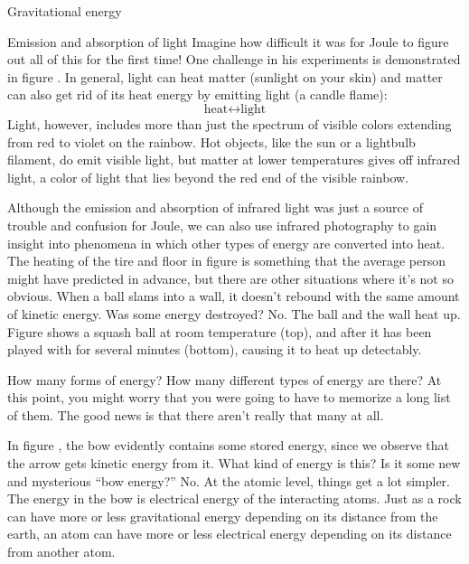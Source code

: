 \begin{envsubsection}{Gravitational energy}
\begin{envsubsection}{Emission and absorption of light}
Imagine how difficult it was for Joule to figure out all of this for the first time! One
challenge in his experiments is demonstrated in figure
. In general, light can heat matter
(sunlight on your skin) and matter can also get rid of its heat energy by emitting light
(a candle flame):
\begin{equation*}
	\text{heat} \leftrightarrow \text{light}
\end{equation*}
Light, however, includes more than just the spectrum of visible colors extending from
red to violet on the rainbow. Hot objects, like the sun or a lightbulb filament, do emit
visible light, but matter at lower temperatures gives off
infrared light, a color of light that lies beyond the red end of the visible rainbow. 

Although the emission and
absorption of infrared light was just a source of trouble and confusion for Joule, we can
also use infrared photography to gain insight into phenomena in which other types of energy
are converted into heat.
The heating of the tire and floor in figure  is something that
the average person might have predicted in advance, but there are other situations
where it's not so obvious. When a ball slams into a wall, it doesn't rebound with the
same amount of kinetic energy. Was some energy destroyed? No.
The ball and the wall heat up. Figure  shows
a squash ball at room temperature (top), and after it has been played with for
several minutes (bottom), causing it to heat up detectably.
\end{envsubsection}
%
\begin{envsubsection}{How many forms of energy?}
How many different types of energy are there? At this point, you might worry that
you were going to have to memorize a long list of them. The good news is that there
aren't really that many at all.


In figure , the bow evidently contains some stored energy, since we observe that
the arrow gets kinetic energy from it. What kind of energy is this? Is it some new and
mysterious ``bow energy?'' No. At the atomic level, things get a lot simpler. The energy
in the bow is electrical energy of the interacting atoms. Just as a rock can have more or
less gravitational energy depending on its distance from the earth, an atom can have more
or less electrical energy depending on its distance from another atom.


\end{envsubsection}
\end{envsubsection}
